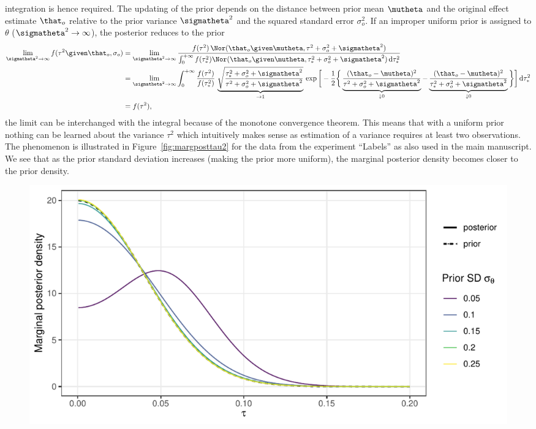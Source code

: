 \begin{subappendices}
integration is hence required. The updating of the prior depends on the distance
between prior mean $\mutheta$ and the original effect estimate $\that_{o}$
relative to the prior variance $\sigmatheta^{2}$ and the squared standard error
$\sigma_{o}^{2}$. If an improper uniform prior is assigned to $\theta$
($\sigmatheta^{2} \to \infty$), the posterior reduces to the prior
\begin{align*}
  \lim_{\sigmatheta^{2} \to \infty} f(\tau^{2} \given \that_{o}, \sigma_{o})
  &= \lim_{\sigmatheta^{2} \to \infty} \frac{f(\tau^{2}) \, \Nor(\that_{o} \given \mutheta, \tau^{2}
    + \sigma^{2}_{o} + \sigmatheta^{2})
    }{\int_{0}^{+\infty} f(\tau^{2}_{*})
    \Nor(\that_{o} \given \mutheta, \tau^{2}_{*} + \sigma^{2}_{o} + \sigmatheta^{2}) \,
    \text{d}\tau^{2}_{*}} \\
  &= \lim_{\sigmatheta^{2} \to \infty}  \int_{0}^{+\infty} \frac{f(\tau^{2})}{f(\tau^{2}_{*})} \,
    \underbrace{\sqrt{\frac{\tau^{2}_{*} + \sigma^{2}_{o} + \sigmatheta^{2}}{\tau^{2} + \sigma^{2}_{o} +
    \sigmatheta^{2}}}}_{\to 1} \, \exp\bigg[-\frac{1}{2}\bigg\{\underbrace{
    \frac{(\that_{o} - \mutheta)^{2}}{\tau^{2} + \sigma^{2}_{o} + \sigmatheta^{2}}}_{\downarrow 0} -
    \underbrace{\frac{(\that_{o} - \mutheta)^{2}}{\tau^{2}_{*} + \sigma^{2}_{o} +
    \sigmatheta^{2}}}_{\downarrow 0} \bigg\}\bigg] \, \text{d}\tau^{2}_{*} \\
  &= f(\tau^{2}),
\end{align*}
the limit can be interchanged with the integral because of the monotone
convergence theorem. This means that with a uniform prior nothing can be learned
about the variance $\tau^{2}$ which intuitively makes sense as estimation of a
variance requires at least two observations. The phenomenon is illustrated in
Figure~\ref{fig:margposttau2} for the data from the experiment ``Labels''
\citep{Protzko2020} as also used in the main manuscript. We see that as the
prior standard deviation increases (making the prior more uniform), the marginal
posterior density becomes closer to the prior density.
\begin{figure}[!htb]
\begin{knitrout}
\color{fgcolor}
\includegraphics[width=\maxwidth]{images/paper3/sup-tau-random-example-1}

\end{knitrout}
\end{figure}
\end{subappendices}
